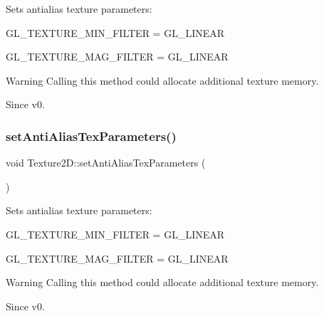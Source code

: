 Sets antialias texture parameters\+:
\begin{DoxyItemize}
\item G\+L\+\_\+\+T\+E\+X\+T\+U\+R\+E\+\_\+\+M\+I\+N\+\_\+\+F\+I\+L\+T\+ER = G\+L\+\_\+\+L\+I\+N\+E\+AR
\item G\+L\+\_\+\+T\+E\+X\+T\+U\+R\+E\+\_\+\+M\+A\+G\+\_\+\+F\+I\+L\+T\+ER = G\+L\+\_\+\+L\+I\+N\+E\+AR
\end{DoxyItemize}

\begin{DoxyWarning}{Warning}
Calling this method could allocate additional texture memory.
\end{DoxyWarning}
\begin{DoxySince}{Since}
v0. 
\end{DoxySince}
\mbox{\label{classTexture2D_a2b9bc7bc273b0793c6b58010c55724e6}} 
\subsubsection{\texorpdfstring{set\+Anti\+Alias\+Tex\+Parameters()}{setAntiAliasTexParameters()}\hspace{0.1cm}{\footnotesize\ttfamily [2/2]}}
{\footnotesize\ttfamily void Texture2\+D\+::set\+Anti\+Alias\+Tex\+Parameters (\begin{DoxyParamCaption}{ }\end{DoxyParamCaption})}

Sets antialias texture parameters\+:
\begin{DoxyItemize}
\item G\+L\+\_\+\+T\+E\+X\+T\+U\+R\+E\+\_\+\+M\+I\+N\+\_\+\+F\+I\+L\+T\+ER = G\+L\+\_\+\+L\+I\+N\+E\+AR
\item G\+L\+\_\+\+T\+E\+X\+T\+U\+R\+E\+\_\+\+M\+A\+G\+\_\+\+F\+I\+L\+T\+ER = G\+L\+\_\+\+L\+I\+N\+E\+AR
\end{DoxyItemize}

\begin{DoxyWarning}{Warning}
Calling this method could allocate additional texture memory.
\end{DoxyWarning}
\begin{DoxySince}{Since}
v0. 
\end{DoxySince}
\mbox{\label{classTexture2D_ac624647313a211073d20a29a07d01622}} 

